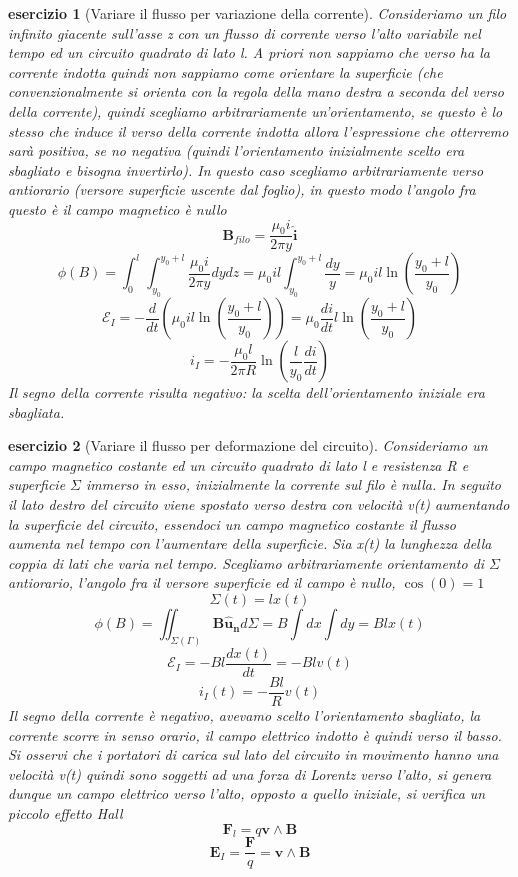\documentclass[10pt,a4paper]{article}
\newtheorem{esercizio}{esercizio}
\begin{document}
\begin{esercizio}[Variare il flusso per variazione della corrente]
Consideriamo un filo infinito giacente sull'asse z con un flusso di corrente verso l'alto variabile nel tempo ed un circuito quadrato di lato l. A priori non sappiamo che verso ha la corrente indotta quindi non sappiamo come orientare la superficie  (che convenzionalmente si orienta con la regola della mano destra a seconda del verso della corrente), quindi scegliamo arbitrariamente un'orientamento, se questo è lo stesso che induce il verso della corrente indotta allora l'espressione che otterremo sarà positiva, se no negativa (quindi l'orientamento inizialmente scelto era sbagliato e bisogna invertirlo). In questo caso scegliamo arbitrariamente verso antiorario (versore superficie uscente dal foglio), in questo modo l'angolo fra questo è il campo magnetico è nullo
\[\mathbf{B}_{filo} = \frac{\mu_0 i}{2\pi y}\mathbf{\hat{i}}\]
\[\phi(B)=\int_0^l\int_{y_0}^{y_0+l} \frac{\mu_0 i}{2\pi y}dydz= \mu_0 i l \int_{y_0}^{y_0+l}\frac{dy}{y}=\mu_0 i l \ln\left(\frac{y_0 + l}{y_0}\right)\]
\[\mathcal{E}_I=-\frac{d}{dt}\left(\mu_0 i l \ln\left(\frac{y_0 + l}{y_0}\right)\right) = \mu_0 \frac{di}{dt} l \ln\left(\frac{y_0 + l}{y_0}\right)\]
\[i_I = -\frac{\mu_0 l}{2\pi R}\ln\left(\frac{l}{y_0}\frac{di}{dt}\right)\]
Il segno della corrente risulta negativo: la scelta dell'orientamento iniziale era sbagliata. 
\end{esercizio}
\begin{esercizio}[Variare il flusso per deformazione del circuito]
Consideriamo un campo magnetico costante ed un circuito quadrato di lato l e resistenza R e superficie $\Sigma$ immerso in esso, inizialmente la corrente sul filo è nulla. In seguito il lato destro del circuito viene spostato verso destra con velocità v(t) aumentando la superficie del circuito, essendoci un campo magnetico costante il flusso aumenta nel tempo con l'aumentare della superficie. Sia x(t) la lunghezza della coppia di lati che varia nel tempo. Scegliamo arbitrariamente orientamento di \(\Sigma\) antiorario, l'angolo fra il versore superficie ed il campo è nullo, \(\cos(0)= 1\)
\[\Sigma(t) = l x(t)\] 
\[\phi(B) = \iint_{\Sigma(\Gamma)}\mathbf{B}\mathbf{\hat{u}_n}d\Sigma = B\int dx\int dy = Blx(t)\]
\[\mathcal{E}_I = -Bl\frac{dx(t)}{dt} = -Blv(t)\]
\[i_I(t) = -\frac{Bl}{R}v(t)\]
Il segno della corrente è negativo, avevamo scelto l'orientamento sbagliato, la corrente scorre in senso orario, il campo elettrico indotto è quindi verso il basso.\\
Si osservi che i portatori di carica sul lato del circuito in movimento hanno una velocità v(t) quindi sono soggetti ad una forza di Lorentz verso l'alto, si genera dunque un campo elettrico verso l'alto, opposto a quello iniziale, si verifica un piccolo effetto Hall
\[\mathbf{F}_l = q \mathbf{v}\wedge\mathbf{B}\]
\[\mathbf{E}_I=\frac{\mathbf{F}}{q} = \mathbf{v}\wedge\mathbf{B}\]
\end{esercizio}
\end{document}
